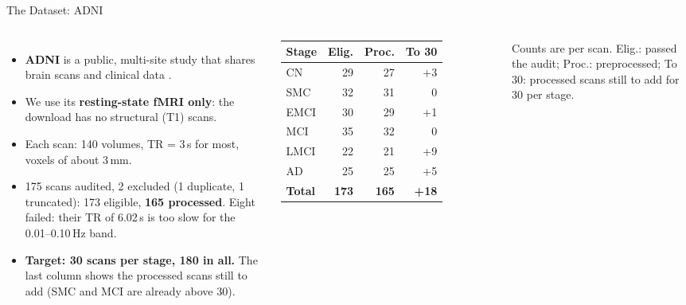 \documentclass[aspectratio=169,11pt]{beamer}
\begin{document}
\begin{frame}{The Dataset: ADNI}
  \begin{columns}[T,onlytextwidth]
      \small
      \begin{itemize}
        \item \textbf{ADNI} is a public, multi-site study that shares brain scans and clinical
              data \cite{r1,r2}.
        \item We use its \textbf{resting-state fMRI only}: the download has no structural (T1) scans.
        \item Each scan: 140 volumes, TR = 3\,s for most, voxels of about 3\,mm.
        \item 175 scans audited, 2 excluded (1 duplicate, 1 truncated): 173 eligible,
              \textbf{165 processed}. Eight failed: their TR of 6.02\,s is too slow for the
              0.01--0.10\,Hz band.
        \item \textbf{Target: 30 scans per stage, 180 in all.} The last column shows the processed scans
              still to add (SMC and MCI are already above 30).
      \end{itemize}
      \centering
      \footnotesize
      \begin{tabular}{lrrr}
        \toprule
        \textbf{Stage} & \textbf{Elig.} & \textbf{Proc.} & \textbf{To 30} \\
        \midrule
        CN   & 29 & 27 & +3 \\
        SMC  & 32 & 31 & 0 \\
        EMCI & 30 & 29 & +1 \\
        MCI  & 35 & 32 & 0 \\
        LMCI & 22 & 21 & +9 \\
        AD   & 25 & 25 & +5 \\
        \midrule
        \textbf{Total} & \textbf{173} & \textbf{165} & \textbf{+18} \\
        \bottomrule
      \end{tabular}\par
      \vspace{0.2cm}
      {\scriptsize Counts are per scan. Elig.: passed the audit; Proc.: preprocessed;
      To 30: processed scans still to add for 30 per stage.}
  \end{columns}
\end{frame}
\end{document}
